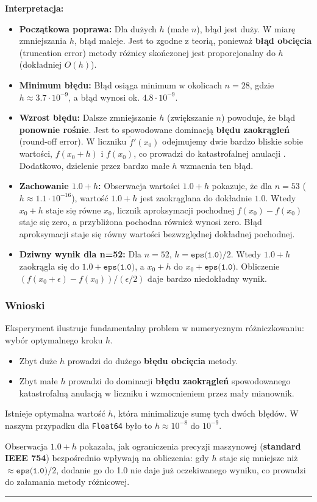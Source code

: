 \documentclass[11pt, a4paper]{article}
\newcommand{\taskseparator}{\leavevmode\leaders\hrule height 0.5pt\hfill\kern0pt}
\begin{document}
\noindent \textbf{Interpretacja:}
\begin{itemize}
    \item \textbf{Początkowa poprawa:} Dla dużych $h$ (małe $n$), błąd jest duży. W miarę zmniejszania $h$, błąd maleje. Jest to zgodne z teorią, ponieważ \textbf{błąd obcięcia} (truncation error) metody różnicy skończonej jest proporcjonalny do $h$ (dokładniej $O(h)$).
    \item \textbf{Minimum błędu:} Błąd osiąga minimum w okolicach $n=28$, gdzie $h \approx 3.7 \cdot 10^{-9}$, a błąd wynosi ok. $4.8 \cdot 10^{-9}$.
    \item \textbf{Wzrost błędu:} Dalsze zmniejszanie $h$ (zwiększanie $n$) powoduje, że błąd \textbf{ponownie rośnie}. Jest to spowodowane dominacją \textbf{błędu zaokrągleń} (round-off error). W liczniku $\tilde{f}'(x_0)$ odejmujemy dwie bardzo bliskie sobie wartości, $f(x_0+h)$ i $f(x_0)$, co prowadzi do  katastrofalnej anulacji . Dodatkowo, dzielenie przez bardzo małe $h$ wzmacnia ten błąd.
    \item \textbf{Zachowanie $1.0 + h$:} Obserwacja wartości $1.0 + h$ pokazuje, że dla $n=53$ ($h \approx 1.1 \cdot 10^{-16}$), wartość $1.0 + h$ jest zaokrąglana do dokładnie $1.0$. Wtedy $x_0 + h$ staje się równe $x_0$, licznik aproksymacji pochodnej $f(x_0) - f(x_0)$ staje się zero, a przybliżona pochodna również wynosi zero. Błąd aproksymacji staje się równy wartości bezwzględnej dokładnej pochodnej.
    \item \textbf{Dziwny wynik dla n=52:} Dla $n=52$, $h = \texttt{eps(1.0)} / 2$. Wtedy $1.0 + h$ zaokrągla się do $1.0 + \texttt{eps(1.0)}$, a $x_0+h$ do $x_0 + \texttt{eps(1.0)}$. Obliczenie $(f(x_0+\epsilon) - f(x_0)) / (\epsilon/2)$ daje bardzo niedokładny wynik.
\end{itemize}

\subsubsection{Wnioski}
Eksperyment ilustruje fundamentalny problem w numerycznym różniczkowaniu: wybór optymalnego kroku $h$.
\begin{itemize}
    \item Zbyt duże $h$ prowadzi do dużego \textbf{błędu obcięcia} metody.
    \item Zbyt małe $h$ prowadzi do dominacji \textbf{błędu zaokrągleń} spowodowanego  katastrofalną anulacją  w liczniku i wzmocnieniem przez mały mianownik.
\end{itemize}
Istnieje optymalna wartość $h$, która minimalizuje sumę tych dwóch błędów. W naszym przypadku dla \texttt{Float64} było to $h \approx 10^{-8}$ do $10^{-9}$.

Obserwacja $1.0 + h$ pokazała, jak ograniczenia precyzji maszynowej (\textbf{standard IEEE 754}) bezpośrednio wpływają na obliczenia: gdy $h$ staje się mniejsze niż $\approx \texttt{eps(1.0)}/2$, dodanie go do 1.0 nie daje już oczekiwanego wyniku, co prowadzi do załamania metody różnicowej.

\taskseparator
\end{document}
